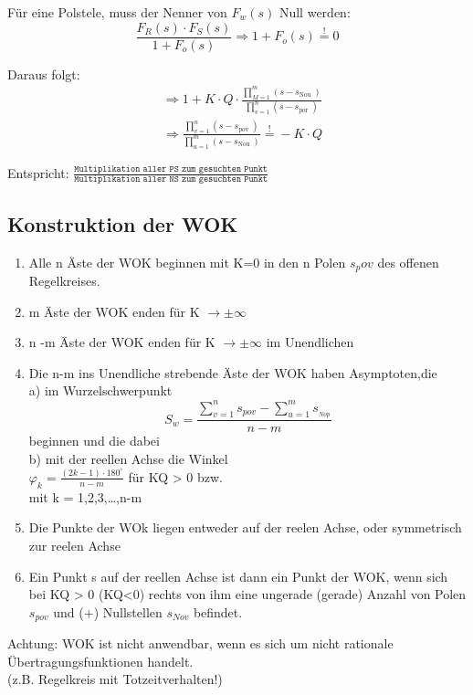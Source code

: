 \documentclass[10pt,a4paper]{article}
\begin{document}
Für eine Polstele, muss der Nenner von $F_w (s)$ Null werden:
\[
	\dfrac{F_R (s) \cdot F_S (s)}{1+F_o (s)} \Rightarrow 1+F_o (s) \stackrel{!}{=}0
\]

Daraus folgt:
\begin{align*}
	 & \Rightarrow 1+ K \cdot Q \cdot \frac{\prod_{M=1}^{m}\left(s-s_{\text {Nou }}\right)}{\prod_{v=1}^{n}\left(s-s_{\text {por }}\right)}         \\
	 & \Rightarrow \frac{\prod_{v=1}^{n}\left(s-s_{\text {pov }}\right)}{\prod_{u=1}^{m}\left(s-s_{\text {Nou }}\right)} \stackrel{!}{=} -K \cdot Q
\end{align*}

Entspricht: $\frac{\texttt{Multiplikation aller PS zum gesuchten Punkt}}
	{\texttt{Multiplikation aller NS zum gesuchten Punkt}}$

\subsection{Konstruktion der WOK}
\begin{mdframed}[style=exercise]
    \begin{enumerate}[leftmargin=*]
		\item Alle n Äste der WOK beginnen mit K=0 in den n Polen $s_pov$ des offenen Regelkreises.
		\item m Äste der WOK enden für K $\rightarrow \pm \infty$
		\item n -m Äste der WOK enden für K $\rightarrow \pm \infty$ im Unendlichen
		\item Die n-m ins Unendliche strebende Äste der WOK haben Asymptoten,die\\
		      a) im Wurzelschwerpunkt
		      \[S_{w}=\frac{\sum_{v=1}^{n} s_{pov}-\sum_{u=1}^{m} s_{_{Nop}}}{n-m}\]
		      beginnen und die dabei\\
		      b) mit der reellen Achse die Winkel\\
		      $\varphi_{k}=\frac{(2 k-1) \cdot 180^{\circ}}{n-m}$ für KQ > 0 bzw.\\
		      mit k = 1,2,3,\dots,n-m
		\item Die Punkte der WOk liegen entweder auf der reelen Achse, oder symmetrisch zur reelen Achse
		\item Ein Punkt s auf der reellen Achse ist dann ein Punkt der WOK, wenn sich bei KQ > 0 (KQ<0)
		      rechts von ihm eine ungerade (gerade) Anzahl von Polen $s_{pov}$ und (+) Nullstellen $s_{Nov}$ befindet.
	\end{enumerate}

	Achtung: WOK ist nicht anwendbar, wenn es sich um nicht rationale
	Übertragungsfunktionen handelt.\\ (z.B. Regelkreis mit Totzeitverhalten!)
\end{mdframed}
\end{document}
